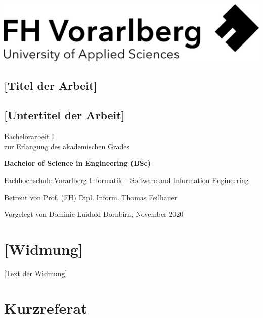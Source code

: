 \documentclass[a4paper,12pt,twoside]{scrreprt}
\begin{document}
\cleardoublepage   %
\thispagestyle{empty}
\begin{titlepage}
  \begin{flushright}
  \includegraphics[width=0.4\linewidth]{Logo_FHV.jpg}
  \end{flushright}
  \begin{flushleft}
  \section*{[Titel der Arbeit]}
  \subsection*{[Untertitel der Arbeit]}
  \vspace{1cm}
  
  Bachelorarbeit I\\
  zur Erlangung des akademischen Grades
  \vspace{0.5cm}
  
  \textbf{Bachelor of Science in Engineering (BSc)}

  \vspace{1cm}
  Fachhochschule Vorarlberg\newline
  Informatik – Software and Information Engineering

  \vspace{0.5cm}
  
  Betreut von\newline
  Prof. (FH) Dipl. Inform. Thomas Feilhauer
  
  \vspace{0.5cm}
  
  Vorgelegt von\newline
  Dominic Luidold\newline
  Dornbirn, November 2020
  \end{flushleft}
\end{titlepage}

\newpage
\section*{[Widmung]}

[Text der Widmung]

\newpage
\section*{Kurzreferat}
\end{document}
